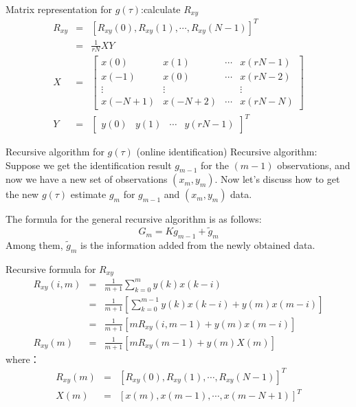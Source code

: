 \begin{frame}{Matrix representation for $g(\tau)$:calculate $R_{xy}$}
\begin{eqnarray*}
R_{xy} &=& [R_{xy}(0),R_{xy}(1),\cdots,R_{xy}(N-1)]^T \\
&=&  \frac{1}{rN}XY \\
X&=&
\begin{bmatrix}
x(0) & x(1) & \cdots & x(rN-1) \\
x(-1) & x(0) & \cdots & x(rN-2) \\
\vdots & \vdots &  & \vdots \\
x(-N+1) & x(-N+2) & \cdots & x(rN-N) 
\end{bmatrix}\\
Y &=& \begin{bmatrix} y(0) & y(1) &\cdots & y(rN-1) \end{bmatrix}^T
\end{eqnarray*}
\end{frame}


\begin{frame}{ Recursive algorithm for $g(\tau)$ (online identification)}
Recursive algorithm: Suppose we get the identification result $g_{m-1}$ for the $(m-1)$ observations, and now we have a new set of observations $(x_m,y_m)$. Now let's discuss how to get the new $g(\tau)$ estimate $g_m$ for $g_{m-1}$ and $(x_m,y_m)$ data.

The formula for the general recursive algorithm is as follows:
$$
G_m = K g_{m-1} + \tilde{g}_m
$$
Among them, $\tilde{g}_m$ is the information added from the newly obtained data.
\end{frame}

\begin{frame}{Recursive formula for $R_{xy}$}
\begin{eqnarray*}
R_{xy}(i,m) &=& \frac{1}{m+1}\sum_{k=0}^m y(k)x(k-i) \\
&=& \frac{1}{m+1}\left[\sum_{k=0}^{m-1} y(k)x(k-i)+y(m)x(m-i)\right] \\
&=& \frac{1}{m+1}\left[mR_{xy}(i,m-1)+y(m)x(m-i)\right] \\
R_{xy}(m)&=& \frac{1}{m+1}\left[mR_{xy}(m-1)+y(m)X(m)\right] %
\end{eqnarray*}
where：
\begin{eqnarray*}
R_{xy}(m) &=& [R_{xy}(0), R_{xy}(1), \cdots, R_{xy}(N-1)]^T \\
X(m) &=& [x(m),x(m-1),\cdots,x(m-N+1)]^T
\end{eqnarray*}
\end{frame}

